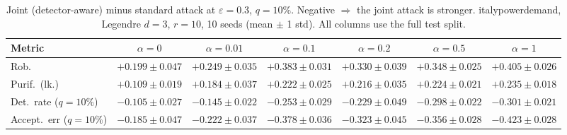 \begin{table}[htbp]
  \centering
  \small
  \begin{tabular}{@{}lcccccc@{}}
    \toprule
    Metric & $\alpha{=}0$ & $\alpha{=}0.01$ & $\alpha{=}0.1$ & $\alpha{=}0.2$ & $\alpha{=}0.5$ & $\alpha{=}1$ \\
    \midrule
    Rob. & $+0.199 \pm 0.047$ & $+0.249 \pm 0.035$ & $+0.383 \pm 0.031$ & $+0.330 \pm 0.039$ & $+0.348 \pm 0.025$ & $+0.405 \pm 0.026$ \\
    Purif.\ (lk.) & $+0.109 \pm 0.019$ & $+0.184 \pm 0.037$ & $+0.222 \pm 0.025$ & $+0.216 \pm 0.035$ & $+0.224 \pm 0.021$ & $+0.235 \pm 0.018$ \\
    Det.\ rate ($q{=}10\%$) & $-0.105 \pm 0.027$ & $-0.145 \pm 0.022$ & $-0.253 \pm 0.029$ & $-0.229 \pm 0.049$ & $-0.298 \pm 0.022$ & $-0.301 \pm 0.021$ \\
    Accept.\ err ($q{=}10\%$) & $-0.185 \pm 0.047$ & $-0.222 \pm 0.037$ & $-0.378 \pm 0.036$ & $-0.323 \pm 0.045$ & $-0.356 \pm 0.028$ & $-0.423 \pm 0.028$ \\
    \bottomrule
  \end{tabular}
  \caption{Joint (detector-aware) minus standard attack at $\varepsilon=0.3$, $q{=}10\%$. Negative $\Rightarrow$ the joint attack is stronger. italypowerdemand, Legendre $d{=}3$, $r{=}10$, 10 seeds (mean $\pm$ 1 std). All columns use the full test split.}
  \label{tab:italypowerdemand_joint_r10_eps0.3}
\end{table}
